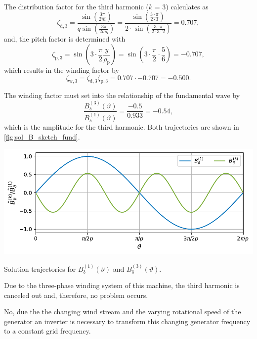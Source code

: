 \begin{solutionblock}
    The distribution factor for the third harmonic ($k$ = 3) calculates as
    $$\zeta_{\mathrm{d,}3} = \frac{\sin\left(\frac{3\pi}{2m} \right)}{q\sin\left(\frac{3\pi}{2mq} \right)} 
    = \frac{\sin\left(\frac{3\cdot \pi}{2\cdot3}\right)}{2 \cdot \sin\left(\frac{3\cdot \pi}{2\cdot3\cdot 2} \right)}
    = 0.707,
    $$
    and, the pitch factor is determined with
    $$
    \zeta_{\mathrm{p,}3} = \sin\left(3 \cdot \frac{\pi}{2} \frac{y}{\rho_{\mathrm{p}}}\right)
    = \sin\left(3 \cdot \frac{\pi}{2} \cdot \frac{5}{6} \right) = -0.707,
    $$
    which results in the winding factor by
    $$ \zeta_{\mathrm{w,}3} =  \zeta_{\mathrm{d,}3}  \zeta_{\mathrm{p,}3} = 0.707 \cdot -0.707 = -0.500. $$

    The winding factor must set into the relationship of the fundamental wave by
    $$ \frac{B_{\updelta}^{(3)}(\vartheta)}{B_{\updelta}^{(1)}(\vartheta)} = \frac{-0.5}{0.933} = -0.54, $$
    which is the amplitude for the third harmonic. Both trajectories are shown in \autoref{fig:sol_B_sketch_fund}.

    \begin{solutionfigure}[ht!]
    \centering
    \includegraphics{fig/sol_B_sketch_fund.pdf}
    \caption{Solution trajectories for $B_{\updelta}^{(1)}(\vartheta)$ and $B_{\updelta}^{(3)}(\vartheta)$.}
    \label{fig:sol_B_sketch_fund}
    \end{solutionfigure}
\end{solutionblock}



\begin{solutionblock}
    Due to the three-phase winding system of this machine, the third harmonic is canceled out and, therefore, no problem occurs.
\end{solutionblock}



\begin{solutionblock}
    No, due the the changing wind stream and the varying rotational speed of the generator an inverter is necessary to transform this changing generator frequency to a constant grid frequency.
\end{solutionblock}






